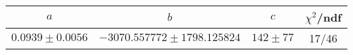 \begin{tabular}{c|c|c|c}
$a$ & $b$ & $c$ & $\chi^2$/ndf \\
\hline
$0.0939\pm0.0056$ & $-3070.557772\pm1798.125824$ & $142\pm77$ & 17/46
\end{tabular}
